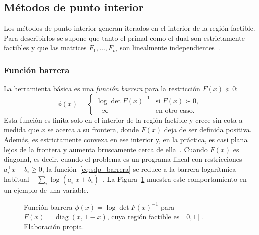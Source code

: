 \subsection{Métodos de punto interior}
\label{subsec:sdp_punto_interior}

Los métodos de punto interior generan iterados en el interior de la región factible. Para
describirlos se supone que tanto el primal como el dual son estrictamente factibles y que las
matrices $F_1, \ldots, F_m$ son linealmente
independientes~\parencite[p.~70]{vandenbergheSemidefiniteProgramming1996}.

\subsubsection*{Función barrera}

La herramienta básica es una \textit{función barrera} para la restricción $F(x) \succeq 0$:
\begin{equation}
    \label{eq:sdp_barrera}
    \phi(x) =
    \begin{cases}
        \log\det F(x)^{-1} & \text{si } F(x) \succ 0, \\
        +\infty            & \text{en otro caso.}
    \end{cases}
\end{equation}
Esta función es finita solo en el interior de la región factible y crece sin cota a medida que
$x$ se acerca a su frontera, donde $F(x)$ deja de ser definida positiva. Además, es
estrictamente convexa en ese interior y, en la práctica, es casi plana lejos de la frontera y
aumenta bruscamente cerca de ella~\parencite[p.~70]{vandenbergheSemidefiniteProgramming1996}.
Cuando $F(x)$ es diagonal, es decir, cuando el problema es un programa lineal con restricciones
$a_i^\top x + b_i \geq 0$, la función~\eqref{eq:sdp_barrera} se reduce a la barrera logarítmica
habitual $-\sum_i \log(a_i^\top x + b_i)$~\parencite[p.~71]{vandenbergheSemidefiniteProgramming1996}.
La Figura~\ref{fig:sdp_barrera} muestra este comportamiento en un ejemplo de una variable.

\begin{figure}[H]
    \centering
    \caption[Función barrera de una desigualdad matricial lineal.]{Función barrera
    $\phi(x) = \log\det F(x)^{-1}$ para $F(x) = \operatorname{diag}(x,\, 1-x)$, cuya región
    factible es $[0, 1]$. Elaboración propia.}
    \label{fig:sdp_barrera}
\end{figure}

